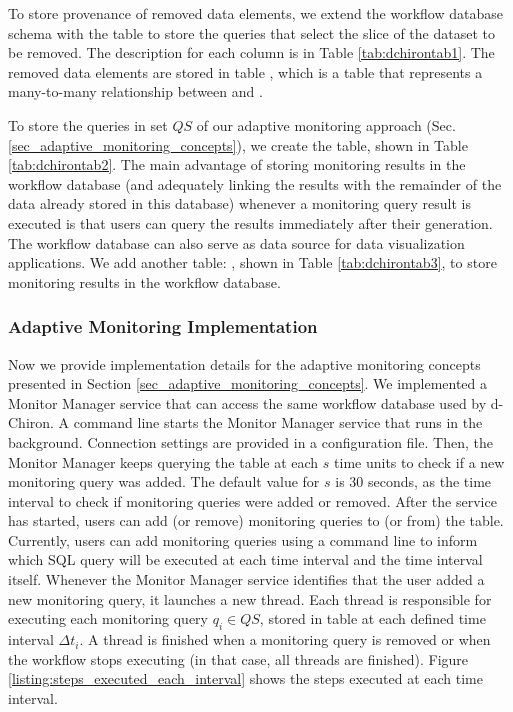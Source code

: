 To
store provenance of removed data elements, we extend the workflow database
schema with the table  to store the queries that select the
slice of the dataset to be removed.
The description for each 
column is in Table \ref{tab:dchirontab1}.
The removed data elements are stored in table , which is a table that represents a
many-to-many relationship between  and
.





To store the queries in set $QS$ of our adaptive monitoring approach (Sec. \ref{sec_adaptive_monitoring_concepts}), we create the   table, shown in Table \ref{tab:dchirontab2}.
The main advantage of storing
monitoring results in the workflow database (and adequately linking the
results with the remainder of the data already stored in this database)
whenever a monitoring query result is executed is that users can
query the results immediately after their generation. The workflow database
can also serve as data source for data visualization applications. We
add another table: , shown in Table \ref{tab:dchirontab3}, to store
monitoring results in the workflow database.






\subsubsection{Adaptive Monitoring Implementation}
\label{adaptive-monitoring-implementation}

Now we provide implementation details for the adaptive monitoring concepts presented in Section \ref{sec_adaptive_monitoring_concepts}.
We implemented a Monitor Manager service that can access the same workflow database used by d-Chiron. A command line starts the Monitor Manager service that runs in the background.
Connection settings
are provided in a configuration file.
Then, the Monitor Manager
keeps querying the  table at each $s$ time units to
check if a new monitoring query was added. The default value for $s$
is 30 seconds, as the time interval to check if monitoring queries were
added or removed.
After the service has
started, users can add (or remove) monitoring queries to (or from) the
 table.
Currently, users can add monitoring queries
using a command line to inform which SQL query will be executed at each
time interval and the time interval itself.
Whenever the Monitor Manager service
identifies that the user added a new monitoring query, it launches a new
thread. Each thread is responsible for executing each monitoring query $q_i \in QS$, stored in table  at each defined time interval $\Delta t_i$. A thread is finished
when a monitoring query is removed or when the workflow stops executing
(in that case, all threads are finished).
Figure \ref{listing:steps_executed_each_interval} shows the steps
executed at each time interval.

